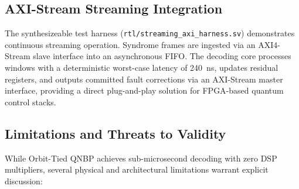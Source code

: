 \documentclass[journal]{IEEEtran}
\begin{document}
\subsection{AXI-Stream Streaming Integration}
The synthesizeable test harness (\texttt{rtl/streaming\_axi\_harness.sv}) demonstrates continuous streaming operation. Syndrome frames are ingested via an AXI4-Stream slave interface into an asynchronous FIFO. The decoding core processes windows with a deterministic worst-case latency of 240~ns, updates residual registers, and outputs committed fault corrections via an AXI-Stream master interface, providing a direct plug-and-play solution for FPGA-based quantum control stacks.

\subsection{Limitations and Threats to Validity}
While Orbit-Tied QNBP achieves sub-microsecond decoding with zero DSP multipliers, several physical and architectural limitations warrant explicit discussion:
\end{document}
